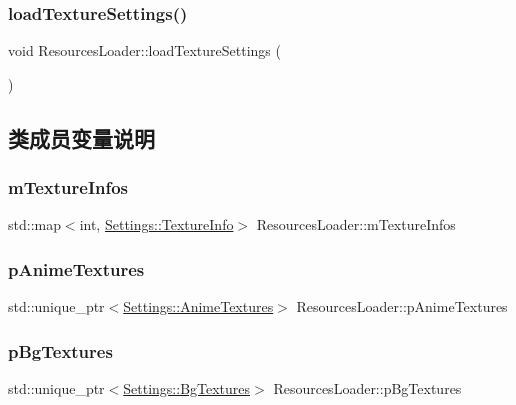 \subsubsection{\texorpdfstring{load\+Texture\+Settings()}{loadTextureSettings()}}
{\footnotesize\ttfamily void Resources\+Loader\+::load\+Texture\+Settings (\begin{DoxyParamCaption}{ }\end{DoxyParamCaption})}



\subsection{类成员变量说明}
\mbox{\label{class_resources_loader_ae364e855ac860a1404ddf324b0ef0300}} 
\subsubsection{\texorpdfstring{m\+Texture\+Infos}{mTextureInfos}}
{\footnotesize\ttfamily std\+::map$<$int, \hyperlink{struct_settings_1_1_texture_info}{Settings\+::\+Texture\+Info}$>$ Resources\+Loader\+::m\+Texture\+Infos}

\mbox{\label{class_resources_loader_a72df15c8b925035fda4edfeb52830d82}} 
\subsubsection{\texorpdfstring{p\+Anime\+Textures}{pAnimeTextures}}
{\footnotesize\ttfamily std\+::unique\+\_\+ptr$<$\hyperlink{struct_settings_1_1_anime_textures}{Settings\+::\+Anime\+Textures}$>$ Resources\+Loader\+::p\+Anime\+Textures}

\mbox{\label{class_resources_loader_aada194614a803df2a3680e5c5992a18a}} 
\subsubsection{\texorpdfstring{p\+Bg\+Textures}{pBgTextures}}
{\footnotesize\ttfamily std\+::unique\+\_\+ptr$<$\hyperlink{struct_settings_1_1_bg_textures}{Settings\+::\+Bg\+Textures}$>$ Resources\+Loader\+::p\+Bg\+Textures}

